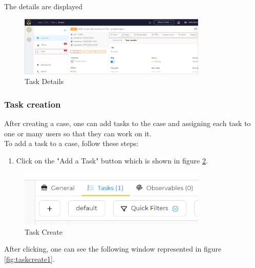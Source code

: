 \documentclass{article}
\begin{document}
The details are displayed

\begin{figure}[H]
    \centering
    \includegraphics[width=0.8\textwidth]{task2.png}
    \caption{Task Details}
    \label{fig:taskdetails}
\end{figure}

\subsubsection*{Task creation}
After creating a case, one can add tasks to the case and assigning each task to one or many users so that they can work on it.\\
To add a task to a case, follow these steps:

\begin{enumerate}
  \item Click on the "Add a Task" button which is shown in figure \ref{fig:taskcreate}.
\end{enumerate}

\begin{figure}[H]
    \centering
    \includegraphics[width=0.8\textwidth]{addTask1.png}
    \caption{Task Create}
    \label{fig:taskcreate}
\end{figure}

After clicking, one can see the following window represented in figure \ref{fig:taskcreate1}.
\end{document}
